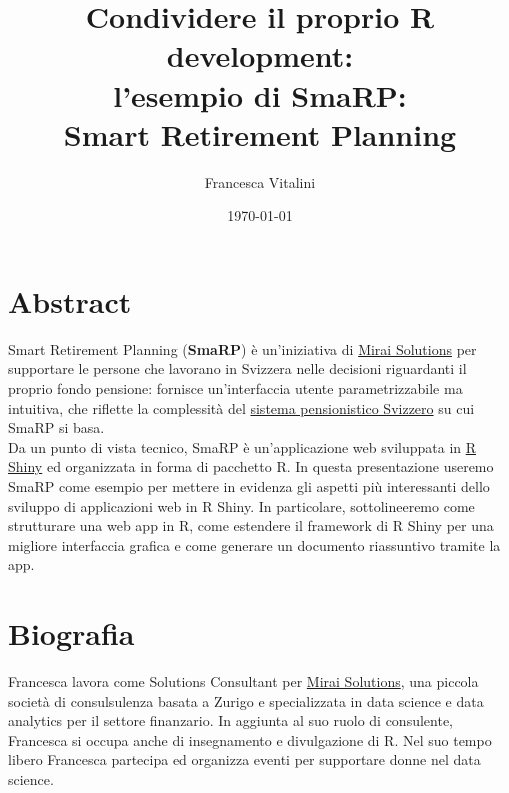 \documentclass[]{article}
\title{Condividere il proprio R development:\\
	l'esempio di SmaRP:\\
	Smart Retirement Planning}
\author{Francesca Vitalini}
\date{\today}
\begin{document}
\maketitle

\section*{\normalsize{Abstract}}
Smart Retirement Planning (\textbf{SmaRP}) è un'iniziativa di \href{https://mirai-solutions.ch/}{Mirai Solutions} per supportare le persone che lavorano in Svizzera nelle decisioni riguardanti il proprio fondo pensione: fornisce un'interfaccia utente parametrizzabile ma intuitiva, che riflette la complessità del \href{ttps://en.wikipedia.org/wiki/Pension_system_in_Switzerland}{sistema pensionistico Svizzero} su cui SmaRP si basa.\\

Da un punto di vista tecnico, SmaRP è un'applicazione web sviluppata in \href{https://shiny.rstudio.com/}{R Shiny} ed organizzata in forma di pacchetto R. 
In questa presentazione useremo SmaRP come esempio per mettere in evidenza gli aspetti più interessanti dello sviluppo di applicazioni web in R Shiny. In particolare, sottolineeremo come strutturare una web app in R, come estendere il framework di R Shiny per una migliore interfaccia grafica e come generare un documento riassuntivo tramite la app.

\section*{\normalsize{Biografia}}
Francesca lavora come Solutions Consultant per \href{https://mirai-solutions.ch/}{Mirai Solutions}, una piccola società di consulsulenza basata a Zurigo e specializzata in data science e data analytics per il settore finanzario. In aggiunta al suo ruolo di consulente, Francesca si occupa anche di insegnamento e divulgazione di R. Nel suo tempo libero Francesca partecipa ed organizza eventi per supportare donne nel data science.
\end{document}
